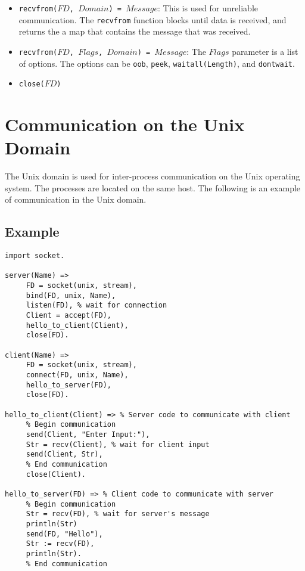 \begin{itemize}
\item \texttt{recvfrom($FD$, $Domain$) = $Message$}: This is used for unreliable communication.  The \texttt{recvfrom} function blocks until data is received, and returns the a map that contains the message that was received.
\item \texttt{recvfrom($FD$, $Flags$, $Domain$) = $Message$}:  The $Flags$ parameter is a list of options.  The options can be \texttt{oob}, \texttt{peek}, \texttt{waitall(Length)}, and \texttt{dontwait}.
\item \texttt{close($FD$)}
\end{itemize}

\section{\label{unix_domain}Communication on the Unix Domain}
The Unix domain is used for inter-process communication on the Unix operating system.  The processes are located on the same host.  The following is an example of communication in the Unix domain.

\subsection*{Example}
\begin{verbatim}
import socket.

server(Name) =>
     FD = socket(unix, stream),
     bind(FD, unix, Name),
     listen(FD), % wait for connection
     Client = accept(FD),
     hello_to_client(Client),
     close(FD).

client(Name) =>
     FD = socket(unix, stream),
     connect(FD, unix, Name),
     hello_to_server(FD),
     close(FD). 

hello_to_client(Client) => % Server code to communicate with client
     % Begin communication
     send(Client, "Enter Input:"),
     Str = recv(Client), % wait for client input
     send(Client, Str),
     % End communication
     close(Client).

hello_to_server(FD) => % Client code to communicate with server
     % Begin communication
     Str = recv(FD), % wait for server's message
     println(Str)
     send(FD, "Hello"),
     Str := recv(FD),
     println(Str).
     % End communication
\end{verbatim}

